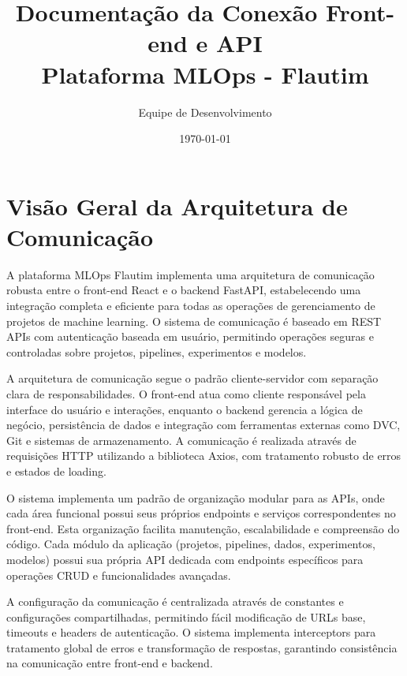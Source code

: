 \documentclass[12pt,a4paper]{article}
\begin{document}
\title{\Huge\textbf{Documentação da Conexão Front-end e API}\\\vspace{0.5cm}\Large Plataforma MLOps - Flautim}
\author{Equipe de Desenvolvimento}
\date{\today}

\maketitle

\tableofcontents
\newpage

\section{Visão Geral da Arquitetura de Comunicação}

A plataforma MLOps Flautim implementa uma arquitetura de comunicação robusta entre o front-end React e o backend FastAPI, estabelecendo uma integração completa e eficiente para todas as operações de gerenciamento de projetos de machine learning. O sistema de comunicação é baseado em REST APIs com autenticação baseada em usuário, permitindo operações seguras e controladas sobre projetos, pipelines, experimentos e modelos.

A arquitetura de comunicação segue o padrão cliente-servidor com separação clara de responsabilidades. O front-end atua como cliente responsável pela interface do usuário e interações, enquanto o backend gerencia a lógica de negócio, persistência de dados e integração com ferramentas externas como DVC, Git e sistemas de armazenamento. A comunicação é realizada através de requisições HTTP utilizando a biblioteca Axios, com tratamento robusto de erros e estados de loading.

O sistema implementa um padrão de organização modular para as APIs, onde cada área funcional possui seus próprios endpoints e serviços correspondentes no front-end. Esta organização facilita manutenção, escalabilidade e compreensão do código. Cada módulo da aplicação (projetos, pipelines, dados, experimentos, modelos) possui sua própria API dedicada com endpoints específicos para operações CRUD e funcionalidades avançadas.

A configuração da comunicação é centralizada através de constantes e configurações compartilhadas, permitindo fácil modificação de URLs base, timeouts e headers de autenticação. O sistema implementa interceptors para tratamento global de erros e transformação de respostas, garantindo consistência na comunicação entre front-end e backend.
\end{document}
